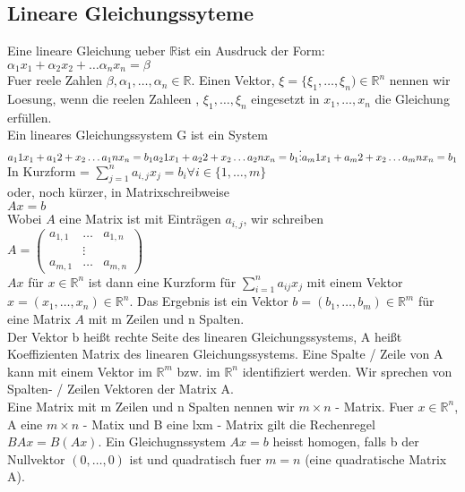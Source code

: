 \documentclass{scrartcl}
\newcommand{\R}{\mathbb{R}}
\newcommand{\mR}{\(\mathbb{R}\)}
\newcommand{\Rn}{\mathbb{R}^n}
\begin{document}
\subsection{Lineare Gleichungssyteme}
Eine lineare Gleichung ueber \mR ist ein Ausdruck der Form:\\
\(
\alpha_1x_1 + \alpha_2 x_2 + \dots \alpha_n x_n = \beta\)\\
Fuer reele Zahlen \(\beta, \alpha_1, \dots, \alpha_n \in \R\). Einen Vektor, \(\xi = \{\xi_1, \dots, \xi_n) \in \Rn\) nennen wir Loesung, wenn die reelen Zahleen  , \(\xi_1, \dots, \xi_n\) eingesetzt in \(x_1, \dots, x_n\) die Gleichung erf\"ullen.\\
Ein lineares Gleichungssystem G ist ein System \\
\(
a_11 x_1 + a_12 + x_2 \dots a_1n x_n = b_1\\
a_21 x_1 + a_22 + x_2 \dots a_2n x_n = b_1\\
\vdots\\
a_m1 x_1 + a_m2 + x_2 \dots a_mn x_n = b_1\\
\)\\
In Kurzform = \(\sum_{j=1}^n a_{i,j} x_j = b_i \forall i\in\{1,\dots,m\}\)\\
oder, noch k\"urzer, in Matrixschreibweise\\
\(Ax=b\)\\
Wobei \(A\) eine Matrix ist mit Eintr\"agen \(a_{i,j}\), wir schreiben\\
\(
A =
\begin{pmatrix}
a_{1, 1} & \dots & a_{1, n}\\
 & \vdots\\
a_{m, 1} & \dots & a_{m, n}
\end{pmatrix}
\)\\
\(Ax\) f\"ur \(x \in \Rn\) ist dann eine Kurzform f\"ur \(\sum_{i=1}^na_{ij}x_j\) mit einem Vektor \(x = (x_1, \dots, x_n) \in \Rn\). Das Ergebnis ist ein Vektor \(b = (b_1, \dots, b_m) \in \R^m\) f\"ur eine Matrix \(A\) mit m Zeilen und n Spalten.\\
Der Vektor b hei\ss{}t rechte Seite des linearen Gleichungssystems, A hei\ss{}t Koeffizienten Matrix des linearen Gleichungssystems. Eine Spalte / Zeile von A kann mit einem Vektor im \(\R^m\) bzw. im \(\R^n\) identifiziert werden. Wir sprechen von Spalten- / Zeilen Vektoren der Matrix A.\\
Eine Matrix mit m Zeilen und n Spalten nennen wir \(m\times n\) - Matrix. Fuer \(x  \in \Rn \), A eine \(m\times n\) - Matix und B eine lxm - Matrix gilt die Rechenregel \(BAx = B(Ax)\). Ein Gleichugnssystem \(Ax=b\) heisst homogen, falls b der Nullvektor \((0, \dots, 0)\) ist und quadratisch fuer \(m = n\) (eine quadratische Matrix A).\\
\end{document}

